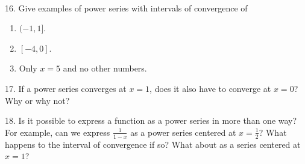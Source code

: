 \documentclass{article}
\begin{document}
~\\

16. Give examples of power series with intervals of convergence of

\begin{enumerate}

	\item $(-1, 1]$.

	\item $[-4, 0]$.

	\item Only $x = 5$ and no other numbers.

\end{enumerate}

17. If a power series converges at $x = 1$, does it also have to converge at $x = 0$? Why or why not?

18. Is it possible to express a function as a power series in more than one way? For example, can we express $\displaystyle \frac{1}{1 - x}$ as a power series centered at $x = \frac{1}{2}$? What happens to the interval of convergence if so? What about as a series centered at $x = 1$?
\end{document}
